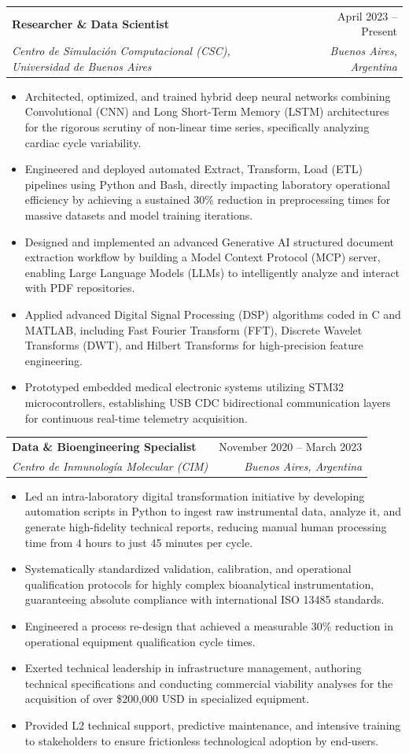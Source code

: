 \documentclass[letterpaper,11pt]{article}
\makeatletter
\newcommand{\resumeItem}[1]{
  \item\small{
    {#1 \vspace{-2pt}}
  }
}
\newcommand{\resumeSubheading}[4]{
  \vspace{-2pt}\item
    \begin{tabular*}{0.97\textwidth}[t]{l@{\extracolsep{\fill}}r}
      \textbf{#1} & #2 \\
      \textit{\small#3} & \textit{\small #4} \\
    \end{tabular*}\vspace{-7pt}
}
\newcommand{\resumeItemListStart}{\begin{itemize}}
\newcommand{\resumeItemListEnd}{\end{itemize}\vspace{-5pt}}
\makeatother
\begin{document}
    \resumeSubheading
      {Researcher \& Data Scientist}{April 2023 -- Present}
      {Centro de Simulación Computacional (CSC), Universidad de Buenos Aires}{Buenos Aires, Argentina}
      \resumeItemListStart
        \resumeItem{Architected, optimized, and trained hybrid deep neural networks combining Convolutional (CNN) and Long Short-Term Memory (LSTM) architectures for the rigorous scrutiny of non-linear time series, specifically analyzing cardiac cycle variability.}
        \resumeItem{Engineered and deployed automated Extract, Transform, Load (ETL) pipelines using Python and Bash, directly impacting laboratory operational efficiency by achieving a sustained 30\% reduction in preprocessing times for massive datasets and model training iterations.}
        \resumeItem{Designed and implemented an advanced Generative AI structured document extraction workflow by building a Model Context Protocol (MCP) server, enabling Large Language Models (LLMs) to intelligently analyze and interact with PDF repositories.}
        \resumeItem{Applied advanced Digital Signal Processing (DSP) algorithms coded in C and MATLAB, including Fast Fourier Transform (FFT), Discrete Wavelet Transforms (DWT), and Hilbert Transforms for high-precision feature engineering.}
        \resumeItem{Prototyped embedded medical electronic systems utilizing STM32 microcontrollers, establishing USB CDC bidirectional communication layers for continuous real-time telemetry acquisition.}
      \resumeItemListEnd

    \resumeSubheading
      {Data \& Bioengineering Specialist}{November 2020 -- March 2023}
      {Centro de Inmunología Molecular (CIM)}{Buenos Aires, Argentina}
      \resumeItemListStart
        \resumeItem{Led an intra-laboratory digital transformation initiative by developing automation scripts in Python to ingest raw instrumental data, analyze it, and generate high-fidelity technical reports, reducing manual human processing time from 4 hours to just 45 minutes per cycle.}
        \resumeItem{Systematically standardized validation, calibration, and operational qualification protocols for highly complex bioanalytical instrumentation, guaranteeing absolute compliance with international ISO 13485 standards.}
        \resumeItem{Engineered a process re-design that achieved a measurable 30\% reduction in operational equipment qualification cycle times.}
        \resumeItem{Exerted technical leadership in infrastructure management, authoring technical specifications and conducting commercial viability analyses for the acquisition of over \$200,000 USD in specialized equipment.}
        \resumeItem{Provided L2 technical support, predictive maintenance, and intensive training to stakeholders to ensure frictionless technological adoption by end-users.}
      \resumeItemListEnd
\end{document}
